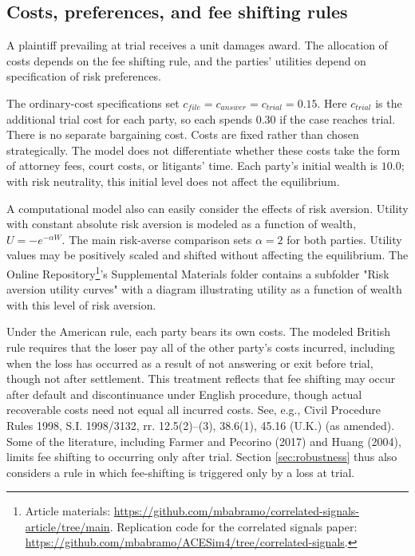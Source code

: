 \documentclass{article}
\begin{document}
\subsection{Costs, preferences, and fee shifting rules}
\label{sec:costs-preferences-fees}

A plaintiff prevailing at trial receives a unit damages award. The allocation of costs depends on the fee shifting rule, and the parties' utilities depend on specification of risk preferences. 

The ordinary-cost specifications set $c_{file}=c_{answer}=c_{trial}=0.15$. Here $c_{trial}$ is the additional trial cost for each party, so each spends $0.30$ if the case reaches trial. There is no separate bargaining cost. Costs are fixed rather than chosen strategically. The model does not differentiate whether these costs take the form of attorney fees, court costs, or litigants' time. Each party's initial wealth is $10.0$; with risk neutrality, this initial level does not affect the equilibrium.

A computational model also can easily consider the effects of risk aversion. Utility with constant absolute risk aversion is modeled as a function of wealth, $U=-e^{-\alpha W}$. The main risk-averse comparison sets $\alpha=2$ for both parties. Utility values may be positively scaled and shifted without affecting the equilibrium. The Online Repository\footnote{Article materials: \url{https://github.com/mbabramo/correlated-signals-article/tree/main}. Replication code for the correlated signals paper: \url{https://github.com/mbabramo/ACESim4/tree/correlated-signals}.}'s Supplemental Materials folder contains a subfolder "Risk aversion utility curves" with a diagram illustrating utility as a function of wealth with this level of risk aversion.

Under the American rule, each party bears its own costs. The modeled British rule requires that the loser pay all of the other party's costs incurred, including when the loss has occurred as a result of not answering or exit before trial, though not after settlement.  This treatment reflects that fee shifting may occur after default and discontinuance under English procedure, though actual recoverable costs need not equal all incurred costs. See, e.g., Civil Procedure Rules 1998, S.I. 1998/3132, rr. 12.5(2)--(3), 38.6(1), 45.16 (U.K.) (as amended). Some of the literature, including Farmer and Pecorino (2017) \cite{farmerpecorino} and Huang (2004), limits fee shifting to occurring only after trial. Section \ref{sec:robustness} thus also considers a rule in which fee-shifting is triggered only by a loss at trial.
\end{document}
